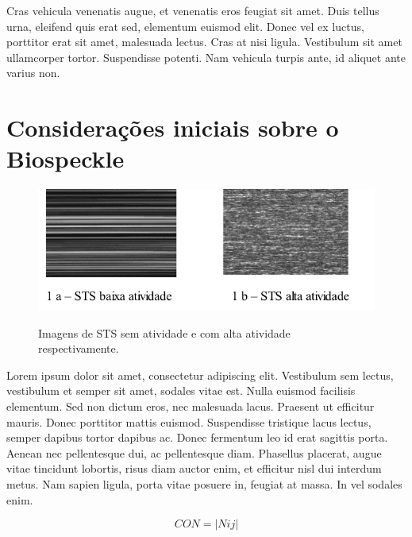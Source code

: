 Cras vehicula venenatis augue, et venenatis eros feugiat sit amet. Duis tellus urna, eleifend quis erat sed, elementum euismod elit. Donec vel ex luctus, porttitor erat sit amet, malesuada lectus. Cras at nisi ligula. Vestibulum sit amet ullamcorper tortor. Suspendisse potenti. Nam vehicula turpis ante, id aliquet ante varius non.


\section{Considerações iniciais sobre o Biospeckle}


\begin{figure}[!htb]
	\caption{Imagens de STS sem atividade e com alta atividade respectivamente.
}
  \centering
  \includegraphics[scale=1.0]{Imagens/imagem_1.png} 
  \label{figura0}
\end{figure}

Lorem ipsum dolor sit amet, consectetur adipiscing elit. Vestibulum sem lectus, vestibulum et semper sit amet, sodales vitae est. Nulla euismod facilisis elementum. Sed non dictum eros, nec malesuada lacus. Praesent ut efficitur mauris. Donec porttitor mattis euismod. Suspendisse tristique lacus lectus, semper dapibus tortor dapibus ac. Donec fermentum leo id erat sagittis porta. Aenean nec pellentesque dui, ac pellentesque diam. Phasellus placerat, augue vitae tincidunt lobortis, risus diam auctor enim, et efficitur nisl dui interdum metus. Nam sapien ligula, porta vitae posuere in, feugiat at massa. In vel sodales enim.



\begin{equation} \label{eq:01}
CON = \left | Nij \right |
\end{equation}


